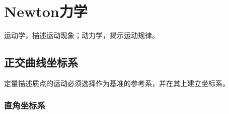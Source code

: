 \chapter{Newton力学}

{\heiti 运动学}，描述运动现象；{\heiti 动力学}，揭示运动规律。

\section{正交曲线坐标系}

定量描述质点的运动必须选择作为基准的参考系，并在其上建立坐标系。

\subsection{直角坐标系}

